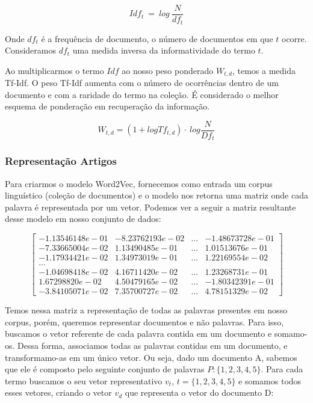 \documentclass[a4paper,12pt]{article}
\begin{document}
  $$ Idf_{t}\ = \ log\ \frac{N}{df_{t}}$$
  
  Onde $df_{t}$ é a frequência de documento, o número de documentos em que $t$ ocorre. Consideramos $df_{t}$ uma medida inversa da informatividade
  do termo $t$.
  
  Ao multiplicarmos o termo $Idf$ ao nosso peso ponderado $W_{t,d}$, temos a medida Tf-Idf. O peso Tf-Idf aumenta com o número de ocorrências
  dentro de um documento e com a raridade do termo na coleção. É considerado o melhor esquema de ponderação em recuperação da informação.
  
  $$ W_{t,d} = (1 + log Tf_{t,d}) \cdot \ log \dfrac{N}{Df_{t}}$$
  
    
  
\subsubsection{Representação Artigos}

  Para criarmos o modelo Word2Vec, fornecemos como entrada um corpus linguístico (coleção de documentos) e o modelo nos retorna uma matriz
  onde cada palavra é representada por um vetor. Podemos ver a seguir a matriz resultante desse modelo em nosso conjunto de dados:
  
  $$\begin{bmatrix}
     -1.13546148e-01 & -8.23762193e-02 & ... & -1.48673728e-01\\
     -7.33665004e-02 &  1.13490485e-01 & ... &  1.01513676e-01\\
     -1.17934421e-02 & 1.34973019e-01  & ... &  1.22169554e-02\\
     ... & & &  \\
     -1.04698418e-02 & 4.16711420e-02 & ... &  1.23268731e-01\\
      1.67298820e-02 &   4.50479165e-02 & ... & -1.80342391e-01\\
     -3.84105071e-02 &   7.35700727e-02 & ... &  4.78151329e-02
    \end{bmatrix}
 $$
 
  Temos nessa matriz a representação de todas as palavras presentes em nosso corpus, porém, queremos representar documentos e não palavras.
  Para isso, buscamos o vetor referente de cada palavra contida em um documento e somamo-os. Dessa forma, associamos todas as palavras contidas
  em um documento, e transformamo-as em um único vetor. Ou seja, dado um documento A, sabemos que ele é composto pelo seguinte conjunto de palavras
  $P:\{1,2,3,4,5\}$. Para cada termo buscamos o seu vetor representativo $v_{t}$, $t =\{1,2,3,4,5\}$ e somamos todos esses vetores, criando o vetor
  $v_{d}$ que representa o vetor do documento D:
  
\end{document}
